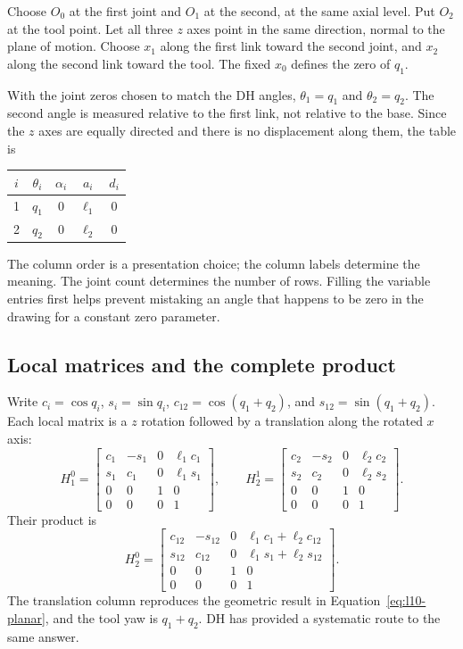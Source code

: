 Choose $O_0$ at the first joint and $O_1$ at the second, at the same axial
level. Put $O_2$ at the tool point. Let all three $z$ axes point in the
same direction, normal to the plane of motion. Choose $x_1$ along the
first link toward the second joint, and $x_2$ along the second link toward
the tool. The fixed $x_0$ defines the zero of $q_1$.

With the joint zeros chosen to match the DH angles, $\theta_1=q_1$ and
$\theta_2=q_2$. The second angle is measured relative to the first link,
not relative to the base. Since the $z$ axes are equally directed and
there is no displacement along them, the table is
\begin{center}
\begin{tabular}{ccccc}
\toprule
$i$ & $\theta_i$ & $\alpha_i$ & $a_i$ & $d_i$\\
\midrule
1 & $q_1$ & $0$ & $\ell_1$ & $0$\\
2 & $q_2$ & $0$ & $\ell_2$ & $0$\\
\bottomrule
\end{tabular}
\end{center}
The column order is a presentation choice; the column labels determine
the meaning. The joint count determines the number of rows. Filling the
variable entries first helps prevent mistaking an angle that happens to
be zero in the drawing for a constant zero parameter.

\subsection{Local matrices and the complete product}
Write $c_i=\cos q_i$, $s_i=\sin q_i$,
$c_{12}=\cos(q_1+q_2)$, and $s_{12}=\sin(q_1+q_2)$.
Each local matrix is a $z$ rotation followed by a translation along the
rotated $x$ axis:
\[
 H_1^0=\begin{bmatrix}
 c_1&-s_1&0&\ell_1c_1\\s_1&c_1&0&\ell_1s_1\\
 0&0&1&0\\0&0&0&1
 \end{bmatrix},\qquad
 H_2^1=\begin{bmatrix}
 c_2&-s_2&0&\ell_2c_2\\s_2&c_2&0&\ell_2s_2\\
 0&0&1&0\\0&0&0&1
 \end{bmatrix}.
\]
Their product is
\begin{equation}
 H_2^0=\begin{bmatrix}
 c_{12}&-s_{12}&0&\ell_1c_1+\ell_2c_{12}\\
 s_{12}&c_{12}&0&\ell_1s_1+\ell_2s_{12}\\
 0&0&1&0\\0&0&0&1
 \end{bmatrix}.
 \label{eq:l10-dh-rr}
\end{equation}
The translation column reproduces the geometric result in
Equation~\eqref{eq:l10-planar}, and the tool yaw is $q_1+q_2$.
DH has provided a systematic route to the same answer.

